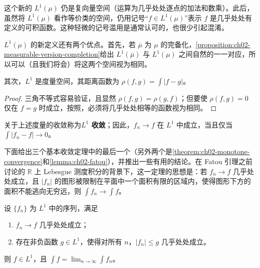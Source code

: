 \documentclass[../../main.tex]{subfiles}%
\begin{document}
\begin{remark}
这个新的 $L^1(\mu)$ 仍是复向量空间（运算为几乎处处逐点的加法和数乘）。此后，虽然将 $L^1(\mu)$ 看作等价类的空间，仍用记号“$f\in L^1(\mu)$”表示 $f$ 是几乎处处有定义的可积函数。这种轻微的记号滥用是通常认可的，也很少引起混淆。
\end{remark}
\begin{remark}
$L^1(\mu)$ 的新定义还有两个优点。首先，若 $\overline{\mu}$ 为 $\mu$ 的完备化，\cref{proposition:ch02-measurable-version-completion}给出 $L^1(\overline{\mu})$ 与 $L^1(\mu)$ 之间自然的一一对应，所以可以（且我们将会）将这两个空间视为相同。
\end{remark}
\begin{proposition}\label{proposition:ch02-lone-metric}
其次，$L^1$ 是度量空间，其距离函数为 $\rho(f,g)=\int|f-g|$。
\end{proposition}
\begin{proof}
三角不等式容易验证，且显然 $\rho(f,g)=\rho(g,f)$；但要使 $\rho(f,g)=0$ 仅在 $f=g$ 时成立，按照，必须将几乎处处相等的函数视为相同。
\end{proof}
\begin{definition}[$L^1$ 收敛]\label{definition:ch02-lone-convergence}
关于上述度量的收敛称为\textbf{$L^1$ 收敛}；因此，$f_n\to f$ 在 $L^1$ 中成立，当且仅当 $\int|f_n-f|\to0$。
\end{definition}
下面给出三个基本收敛定理中的最后一个（另外两个是\cref{theorem:ch02-monotone-convergence}和\cref{lemma:ch02-fatou}），并推出一些有用的结论。在 Fatou 引理之前讨论的 $\mathbb{R}$ 上 Lebesgue 测度积分的背景下，这一定理的思想是：若 $f_n\to f$ 几乎处处成立，且 $|f_n|$ 的图形被限制在平面中一个面积有限的区域内，使得图形下方的面积不能逃向无穷远，则 $\int f_n\to\int f$。
\begin{theorem}[控制收敛定理]\label{theorem:ch02-dominated-convergence}
设 $\{f_n\}$ 为 $L^1$ 中的序列，满足
\begin{enumerate}
\item\label{item:ch02-dominated-pointwise} $f_n\to f$ 几乎处处成立；
\item\label{item:ch02-dominated-majorant} 存在非负函数 $g\in L^1$，使得对所有 $n$，$|f_n|\le g$ 几乎处处成立。
\end{enumerate}
则 $f\in L^1$，且 $\int f=\lim_{n\to\infty}\int f_n$。
\end{theorem}
\end{document}
